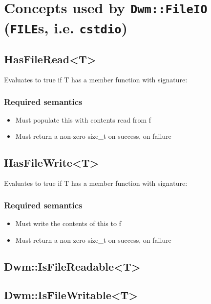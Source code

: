 \begin{minipage}{\textwidth}
\section{Concepts used by \texttt{Dwm::FileIO} (\texttt{FILE}s, i.e. \texttt{cstdio})}
\hypertarget{concept:HasFileRead}{\subsection{\ttfamily HasFileRead<T>}}
Evaluates to true if {\ttfamily T} has a member function with signature:


\subsubsection{Required semantics}
\begin{itemize}[noitemsep,nolistsep]
  \item Must populate {\ttfamily *this} with contents read from {\ttfamily f}
  \item Must return a non-zero {\ttfamily size\_t} on success, {}
    on failure
\end{itemize}

\hypertarget{concept:HasFileWrite}{\subsection{\ttfamily HasFileWrite<T>}}
Evaluates to true if {\ttfamily T} has a member function with signature:


\subsubsection{Required semantics}
\begin{itemize}[noitemsep,nolistsep]
\item Must write the contents of {\ttfamily *this} to {\ttfamily f}
\item Must return a non-zero {\ttfamily size\_t} on success, {}
  on failure
\end{itemize}

\subsection{\ttfamily Dwm::IsFileReadable<T>}\label{concept:DwmIsFileReadable}

\subsection{\ttfamily Dwm::IsFileWritable<T>}\label{concept:DwmIsFileWritable}
\end{minipage}

